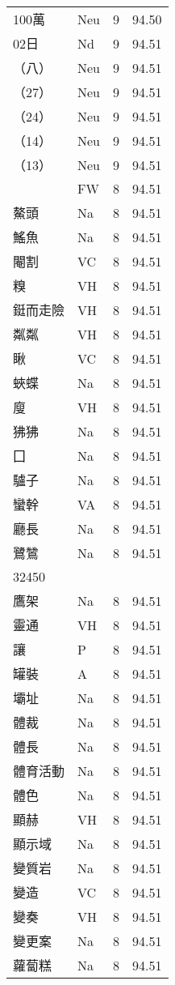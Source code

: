 \documentclass[twocolumn]{book}
\begin{document}
\begin{supertabular}{llrr}
100萬 & Neu & 9 &  94.50\\
02日 & Nd & 9 &  94.51\\
（八） & Neu & 9 &  94.51\\
（27） & Neu & 9 &  94.51\\
（24） & Neu & 9 &  94.51\\
（14） & Neu & 9 &  94.51\\
（13） & Neu & 9 &  94.51\\
 & FW & 8 &  94.51\\
鰲頭 & Na & 8 &  94.51\\
鰩魚 & Na & 8 &  94.51\\
閹割 & VC & 8 &  94.51\\
糗 & VH & 8 &  94.51\\
鋌而走險 & VH & 8 &  94.51\\
粼粼 & VH & 8 &  94.51\\
瞅 & VC & 8 &  94.51\\
蛺蝶 & Na & 8 &  94.51\\
廋 & VH & 8 &  94.51\\
狒狒 & Na & 8 &  94.51\\
囗 & Na & 8 &  94.51\\
驢子 & Na & 8 &  94.51\\
蠻幹 & VA & 8 &  94.51\\
廳長 & Na & 8 &  94.51\\
鷺鷥 & Na & 8 &  94.51\\
32450\\
鷹架 & Na & 8 &  94.51\\
靈通 & VH & 8 &  94.51\\
讓 & P & 8 &  94.51\\
罐裝 & A & 8 &  94.51\\
壩址 & Na & 8 &  94.51\\
體裁 & Na & 8 &  94.51\\
體長 & Na & 8 &  94.51\\
體育活動 & Na & 8 &  94.51\\
體色 & Na & 8 &  94.51\\
顯赫 & VH & 8 &  94.51\\
顯示域 & Na & 8 &  94.51\\
變質岩 & Na & 8 &  94.51\\
變造 & VC & 8 &  94.51\\
變奏 & VH & 8 &  94.51\\
變更案 & Na & 8 &  94.51\\
蘿蔔糕 & Na & 8 &  94.51\\

\end{supertabular}
\end{document}
